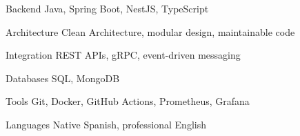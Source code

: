 

\begin{cvskills}

  \cvskill
    {Backend}
    {Java, Spring Boot, NestJS, TypeScript}

  \cvskill
    {Architecture}
    {Clean Architecture, modular design, maintainable code}

  \cvskill
    {Integration}
    {REST APIs, gRPC, event-driven messaging}

  \cvskill
    {Databases}
    {SQL, MongoDB}

  \cvskill
    {Tools}
    {Git, Docker, GitHub Actions, Prometheus, Grafana}

  \cvskill
    {Languages}
    {Native Spanish, professional English}

\end{cvskills}
